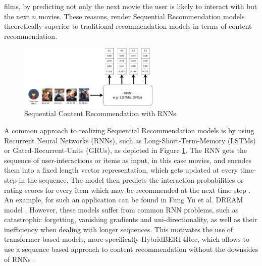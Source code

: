 \documentclass{Academic}
\begin{document}
films, by predicting not only the next movie the user is likely to interact with but the next $n$ movies. These reasons, render Sequential Recommendation models theoretically superior to traditional recommendation models in terms of content recommendation. \\
    \begin{figure}[ht!]
        \centering
        \includegraphics[width=0.6\textwidth]{images/rnn_seq.pdf}
        \caption{Sequential Content Recommendation with RNNs \cite{yuDynamicRecurrentModel2016}}
        \label{fig:seqRNN}
    \end{figure}
    A common approach to realizing Sequential Recommendation models is by using Recurrent Neural Networks (RNNs), such as Long-Short-Term-Memory (LSTMs) or Gated-Recurrent-Units (GRUs), as depicted in Figure \ref{fig:seqRNN}. The RNN gets the sequence of user-interactions or items as input, in this case movies, and encodes them into a fixed length vector representation, which gets updated at every time-step in the sequence. The model then predicts the interaction probabilities or rating scores for every item which may be recommended at the next time step \cite{yuDynamicRecurrentModel2016}. An example, for such an application can be found in Fung Yu et al. DREAM model \cite{yuDynamicRecurrentModel2016}. However, these models suffer from common RNN problems, such as catastrophic forgetting, vanishing gradients and uni-directionality, as well as their inefficiency when dealing with longer sequences. This motivates the use of transformer based models, more specifically HybridBERT4Rec, which allows to use a sequence based approach to content recommendation without the downsides of RNNs \cite{channarongHybridBERT4RecHybridContentBased2022}.

    \FloatBarrier
\end{document}
